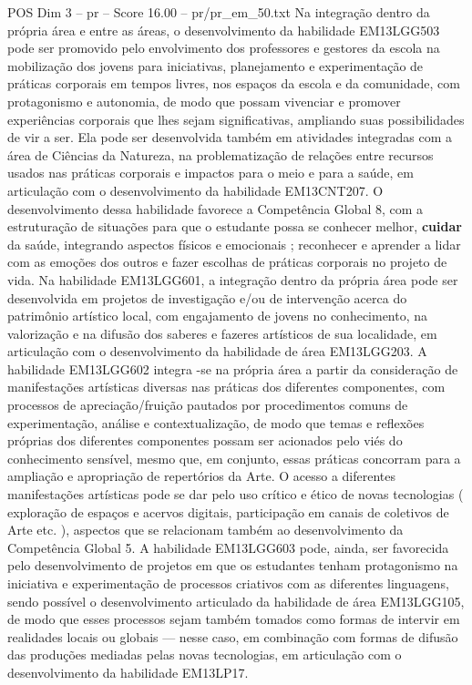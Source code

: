 \begin{textsample}{POS Dim 3 – pr – Score 16.00 – pr/pr\_em\_50.txt}
Na integração dentro da própria área e entre as áreas, o desenvolvimento da habilidade EM13LGG503 pode ser promovido pelo envolvimento dos professores e gestores da escola na mobilização dos jovens para iniciativas, planejamento e experimentação de práticas corporais em tempos livres, nos espaços da escola e da comunidade, com protagonismo e autonomia, de modo que possam vivenciar e promover experiências corporais que lhes sejam significativas, ampliando suas possibilidades de vir a ser.
Ela pode ser desenvolvida também em atividades integradas com a área de Ciências da Natureza, na problematização de relações entre recursos usados nas práticas corporais e impactos para o meio e para a saúde, em articulação com o desenvolvimento da habilidade EM13CNT207.
O desenvolvimento dessa habilidade favorece a Competência Global 8, com a estruturação de situações para que o estudante possa se conhecer melhor, \textbf{cuidar} da saúde, integrando aspectos físicos e emocionais ; reconhecer e aprender a lidar com as emoções dos outros e fazer escolhas de práticas corporais no projeto de vida.
Na habilidade EM13LGG601, a integração dentro da própria área pode ser desenvolvida em projetos de investigação e/ou de intervenção acerca do patrimônio artístico local, com engajamento de jovens no conhecimento, na valorização e na difusão dos saberes e fazeres artísticos de sua localidade, em articulação com o desenvolvimento da habilidade de área EM13LGG203.
A habilidade EM13LGG602 integra -se na própria área a partir da consideração de manifestações artísticas diversas nas práticas dos diferentes componentes, com processos de apreciação/fruição pautados por procedimentos comuns de experimentação, análise e contextualização, de modo que temas e reflexões próprias dos diferentes componentes possam ser acionados pelo viés do conhecimento sensível, mesmo que, em conjunto, essas práticas concorram para a ampliação e apropriação de repertórios da Arte.
O acesso a diferentes manifestações artísticas pode se dar pelo uso crítico e ético de novas tecnologias ( exploração de espaços e acervos digitais, participação em canais de coletivos de Arte etc. ), aspectos que se relacionam também ao desenvolvimento da Competência Global 5.
A habilidade EM13LGG603 pode, ainda, ser favorecida pelo desenvolvimento de projetos em que os estudantes tenham protagonismo na iniciativa e experimentação de processos criativos com as diferentes linguagens, sendo possível o desenvolvimento articulado da habilidade de área EM13LGG105, de modo que esses processos sejam também tomados como formas de intervir em realidades locais ou globais — nesse caso, em combinação com formas de difusão das produções mediadas pelas novas tecnologias, em articulação com o desenvolvimento da habilidade EM13LP17.

\end{textsample}
